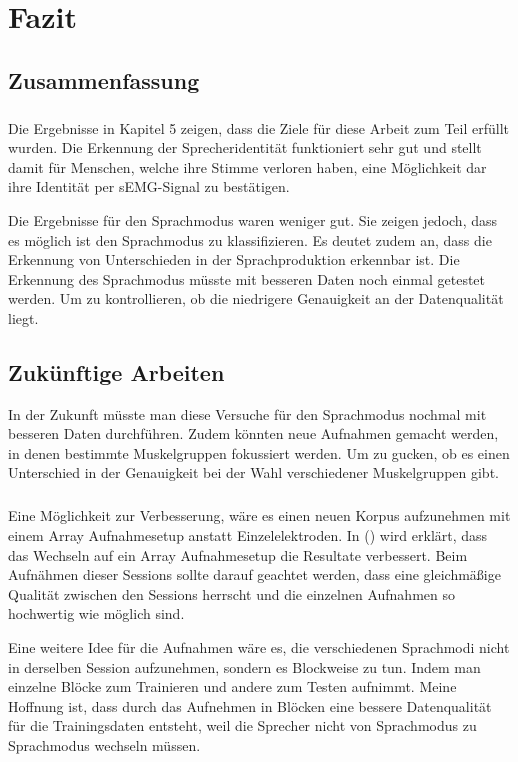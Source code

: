 \chapter{Fazit}
\section{Zusammenfassung}
\paragraph{}
Die Ergebnisse in Kapitel 5 zeigen, dass die Ziele für diese Arbeit zum Teil erfüllt wurden. Die Erkennung der Sprecheridentität funktioniert sehr gut und stellt damit für Menschen, welche ihre Stimme verloren haben, eine Möglichkeit dar ihre Identität per sEMG-Signal zu bestätigen.
 
Die Ergebnisse für den Sprachmodus waren weniger gut. Sie zeigen jedoch, dass es möglich ist den Sprachmodus zu klassifizieren. Es deutet zudem an, dass die Erkennung von Unterschieden in der Sprachproduktion erkennbar ist. Die Erkennung des Sprachmodus müsste mit besseren Daten noch einmal getestet werden. Um zu kontrollieren, ob die niedrigere Genauigkeit an der Datenqualität liegt.

\section{Zukünftige Arbeiten}
In der Zukunft müsste man diese Versuche für den Sprachmodus nochmal mit besseren Daten durchführen. Zudem könnten neue Aufnahmen gemacht werden, in denen bestimmte Muskelgruppen fokussiert werden. Um zu gucken, ob es einen Unterschied in der Genauigkeit bei der Wahl verschiedener Muskelgruppen gibt.

\paragraph{}
Eine Möglichkeit zur Verbesserung, wäre es einen neuen Korpus aufzunehmen mit einem Array Aufnahmesetup anstatt Einzelelektroden. In (\cite{diener2020cslemgarray}) wird erklärt, dass das Wechseln auf ein Array Aufnahmesetup die Resultate verbessert. Beim Aufnähmen dieser Sessions sollte darauf geachtet werden, dass eine gleichmäßige Qualität zwischen den Sessions herrscht und die einzelnen Aufnahmen so hochwertig wie möglich sind.

Eine weitere Idee für die Aufnahmen wäre es, die verschiedenen Sprachmodi nicht in derselben Session aufzunehmen, sondern es Blockweise zu tun. Indem man einzelne Blöcke zum Trainieren und andere zum Testen aufnimmt. Meine Hoffnung ist, dass durch das Aufnehmen in Blöcken eine bessere Datenqualität für die Trainingsdaten entsteht, weil die Sprecher nicht von Sprachmodus zu Sprachmodus wechseln müssen.

